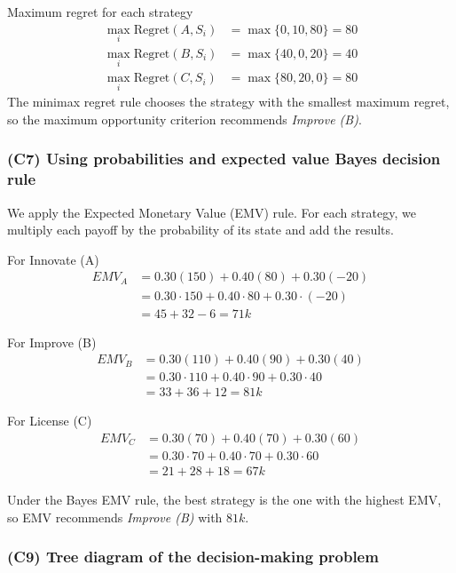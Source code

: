 \documentclass[11pt]{article}
\begin{document}
	Maximum regret for each strategy
	\[
	\begin{aligned}
		\max_i \text{Regret}(A, S_i) &= \max\{0, 10, 80\} = 80\\
		\max_i \text{Regret}(B, S_i) &= \max\{40, 0, 20\} = 40\\
		\max_i \text{Regret}(C, S_i) &= \max\{80, 20, 0\} = 80
	\end{aligned}
	\]
	The minimax regret rule chooses the strategy with the smallest maximum regret, so the
	maximum opportunity criterion recommends \emph{Improve (B)}.
	
	\subsubsection{(C7) Using probabilities and expected value Bayes decision rule}\label{example-1-c7}
	
	We apply the Expected Monetary Value (EMV) rule. For each strategy, we multiply each payoff by the probability
	of its state and add the results.
	
	For Innovate (A)
	\[
	\begin{aligned}
		EMV_A &= 0.30(150) + 0.40(80) + 0.30(-20) \\
		&= 0.30\cdot150 + 0.40\cdot80 + 0.30\cdot(-20) \\
		&= 45 + 32 - 6 = 71k
	\end{aligned}
	\]
	
	For Improve (B)
	\[
	\begin{aligned}
		EMV_B &= 0.30(110) + 0.40(90) + 0.30(40) \\
		&= 0.30\cdot110 + 0.40\cdot90 + 0.30\cdot40 \\
		&= 33 + 36 + 12 = 81k
	\end{aligned}
	\]
	
	For License (C)
	\[
	\begin{aligned}
		EMV_C &= 0.30(70) + 0.40(70) + 0.30(60) \\
		&= 0.30\cdot70 + 0.40\cdot70 + 0.30\cdot60 \\
		&= 21 + 28 + 18 = 67k
	\end{aligned}
	\]
	
	Under the Bayes EMV rule, the best strategy is the one with the highest EMV, so EMV recommends
	\emph{Improve (B)} with \(81k\).
	
	\subsubsection{(C9) Tree diagram of the decision-making problem}\label{example-1-c9}
	
\end{document}
